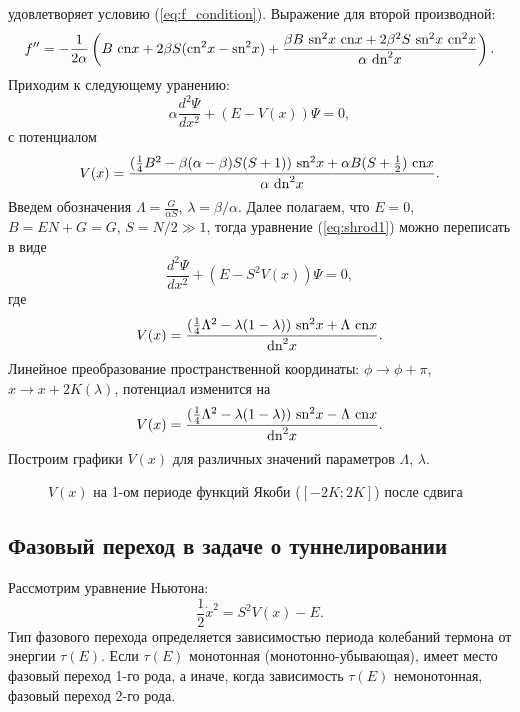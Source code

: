\documentclass[12pt]{article}
\begin{document}
%
удовлетворяет условию (\ref{eq:f_condition}).
Выражение для второй производной:
%
$$f'' = -\frac{1}{2 \alpha} \left( B~\textrm{cn} x + 2\beta S (\textrm{cn}^2 x - \textrm{sn}^2 x) + \frac{\beta B~\textrm{sn}^2 x~\textrm{cn} x + 2 \beta^2 S~\textrm{sn}^2 x~\textrm{cn}^2 x}{\alpha~\textrm{dn}^2 x} \right).$$
%
Приходим к следующему уранению:
%
\begin{equation}
\alpha \frac{d^2 \Psi}{dx^2} + (E - V(x)) \Psi = 0,
\label{eq:shrod1}
\end{equation}
%
с потенциалом
%
\begin{equation}
V(x) = \frac{(\frac{1}{4}B^2 - \beta(\alpha - \beta) S (S+1))~\textrm{sn}^2 x + \alpha B (S + \frac{1}{2})~\textrm{cn} x}{\alpha~\textrm{dn}^2 x}.
\end{equation}
%
Введем обозначения $\Lambda = \frac{G}{\alpha S}$, $\lambda = \beta / \alpha$.
Далее полагаем, что $E = 0$, $B = EN + G = G$, $S = N/2 \gg 1$, тогда уравнение (\ref{eq:shrod1}) можно переписать в виде
%
\begin{equation}
\frac{d^2 \Psi}{dx^2} + (E - S^2 V(x)) \Psi = 0,
\label{eq:shrod2}
\end{equation}
% 
где
%
\begin{equation}
V(x) = \frac{(\frac{1}{4} \Lambda^2 - \lambda (1 - \lambda))~\textrm{sn}^2 x + \Lambda~\textrm{cn} x}{\textrm{dn}^2 x}.
\end{equation}
%
Линейное преобразование пространственной координаты: $\phi \to \phi + \pi$, $x \to x + 2K(\lambda)$, потенциал изменится на
%
\begin{equation}
V(x) = \frac{(\frac{1}{4} \Lambda^2 - \lambda (1 - \lambda))~\textrm{sn}^2 x - \Lambda~\textrm{cn} x}{\textrm{dn}^2 x}.
\end{equation}
%
Построим графики $V(x)$ для различных значений параметров $\Lambda$, $\lambda$.
%
\begin{figure}[Ht!]
\caption{$V(x)$ на 1-ом периоде функций Якоби ($[-2K; 2K]$) после сдвига}
\end{figure}
%
%

\subsection*{Фазовый переход в задаче о туннелировании}

Рассмотрим уравнение Ньютона:
%
\begin{equation}
\frac{1}{2} \dot{x}^2 = S^2 V(x) - E.
\end{equation}
%
Тип фазового перехода определяется зависимостью периода колебаний термона от энергии $\tau(E)$.
Если $\tau(E)$ монотонная (монотонно-убывающая), имеет место фазовый переход 1-го рода, а иначе, когда зависимость $\tau(E)$ немонотонная, фазовый переход 2-го рода.
\end{document}
